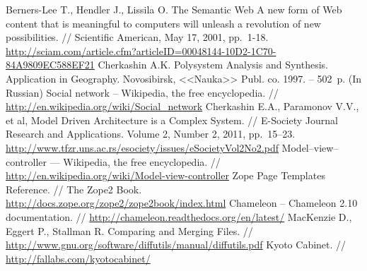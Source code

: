 \documentclass[conference]{IEEEtran}
\begin{document}
%
%
%
\begin{thebibliography}{11}
 Berners-Lee T., Hendler J., Lissila O. The
  Semantic Web A new form of Web content that is meaningful to
  computers will unleash a revolution of new possibilities. //
  Scientific American, May 17, 2001,
  pp.~1-18. \url{http://sciam.com/article.cfm?articleID=00048144-10D2-1C70-84A9809EC588EF21}
 Cherkashin A.K. Polysystem Analysis and
  Synthesis. Application in Geography. Novosibirsk, <<Nauka>> Publ. co.
  1997. -- 502~p. (In Russian)
 Social network -- Wikipedia, the free encyclopedia. //
  \url{http://en.wikipedia.org/wiki/Social_network}
 Cherkashin E.A., Paramonov V.V., et al, Model Driven
  Architecture is a Complex System. // E-Society Journal Research and
  Applications. Volume 2, Number 2, 2011, pp.~15--23.
  \url{http://www.tfzr.uns.ac.rs/esociety/issues/eSocietyVol2No2.pdf}
 Model–view–controller --- Wikipedia, the free
  encyclopedia. //
  \url{http://en.wikipedia.org/wiki/Model-view-controller}
 Zope Page Templates Reference. // The Zope2 Book. \url{http://docs.zope.org/zope2/zope2book/index.html}
 Chameleon -- Chameleon 2.10 documentation. //
  \url{http://chameleon.readthedocs.org/en/latest/}
 MacKenzie D., Eggert P., Stallman R. Comparing and
  Merging Files. //
  \url{http://www.gnu.org/software/diffutils/manual/diffutils.pdf}
 Kyoto Cabinet. // \url{http://fallabs.com/kyotocabinet/}
\end{thebibliography}
\end{document}
